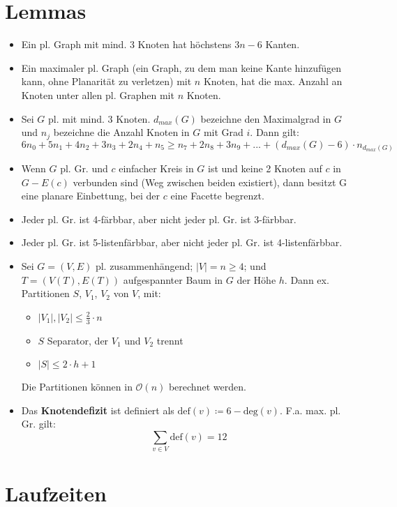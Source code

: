 \documentclass[a4paper,11pt]{report}
\begin{document}
\chapter{Lemmas}
\begin{itemize}
    \item Ein pl. Graph mit mind. 3 Knoten hat höchstens $3n-6$ Kanten.
    \item Ein maximaler pl. Graph (ein Graph, zu dem man keine Kante hinzufügen kann, ohne Planarität zu verletzen) mit $n$ Knoten, hat die max. Anzahl an Knoten unter allen pl. Graphen mit $n$ Knoten.
    \item Sei $G$ pl. mit mind. 3 Knoten. $d_{max}(G)$ bezeichne den Maximalgrad in $G$ und $n_j$ bezeichne die Anzahl Knoten in $G$ mit Grad $i$. Dann gilt: \[6 n_0 + 5 n_1 + 4 n_2 + 3 n_3 + 2 n_4 + n_5 \geq n_7 + 2 n_8 + 3 n_9 + ... + (d_{max}(G) - 6) \cdot n_{d_{max}(G)}\]
    \item Wenn $G$ pl. Gr. und $c$ einfacher Kreis in $G$ ist und keine 2 Knoten auf $c$ in $G - E(c)$ verbunden sind (Weg zwischen beiden existiert), dann besitzt G eine planare Einbettung, bei der $c$ eine Facette begrenzt.
    \item Jeder pl. Gr. ist 4-färbbar, aber nicht jeder pl. Gr. ist 3-färbbar.
    \item Jeder pl. Gr. ist 5-listenfärbbar, aber nicht jeder pl. Gr. ist 4-listenfärbbar.
    \item Sei $G = (V, E)$ pl. zusammenhängend; $|V| = n \geq 4$; und $T = (V(T), E(T))$ aufgespannter Baum in $G$ der Höhe $h$. Dann ex. Partitionen $S$, $V_1$, $V_2$ von $V$, mit:
    \begin{itemize}
        \item $|V_1|, |V_2| \leq \frac{2}{3} \cdot n$
        \item $S$ Separator, der $V_1$ und $V_2$ trennt
        \item $|S| \leq 2 \cdot h + 1$
    \end{itemize}
    Die Partitionen können in $\mathcal{O}(n)$ berechnet werden.

    \item Das {\bf Knotendefizit} ist definiert als $\text{def}(v) \coloneqq 6 - \text{deg}(v)$. F.a. max. pl. Gr. gilt: $$\sum_{v \in V} \text{def}(v) = 12$$
\end{itemize}


\chapter{Laufzeiten}
\end{document}
